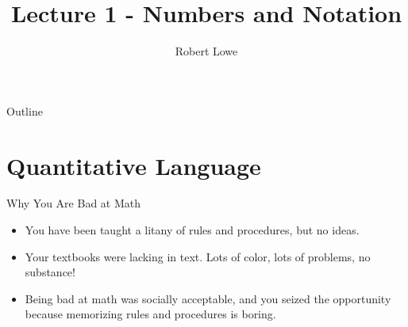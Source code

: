 \documentclass{beamer}
\title{Lecture 1 - Numbers and Notation}
\author{Robert Lowe\\}
\institute[Maryville College] %
{
  Division of Mathematics and Computer Science\\
  Maryville College
}
\date[]{}
\begin{document}
\begin{frame}
  \titlepage
\end{frame}

\begin{frame}{Outline}
  \tableofcontents
\end{frame}


%
%

\section{Quantitative Language}

\begin{frame}{Why You Are Bad at Math}

\begin{itemize}[<+(1)->]
    \item You have been taught a litany of rules and procedures, but no ideas.
    \item Your textbooks were lacking in text.  Lots of color, lots of problems, no substance!
    \item Being bad at math was socially acceptable, and you seized the opportunity because memorizing rules and procedures is boring.
\end{itemize}

\end{frame}
\end{document}
